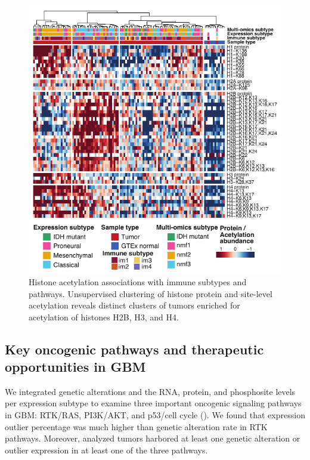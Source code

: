 \begin{figure}[tb]
    \centering
    \includegraphics[width=0.75\linewidth]{figures/chap04_cptac_gbm_discov/figure5_histone_acetyl.pdf}
    \caption[Histone acetylation associations with immune subtypes and pathways.]{%
        Histone acetylation associations with immune subtypes and pathways.
        Unsupervised clustering of histone protein and site-level acetylation reveals distinct clusters of tumors enriched for acetylation of histones H2B, H3, and H4.
    }
    \label{fig:gbm-histone-acetyl}
\end{figure}


\subsection{Key oncogenic pathways and therapeutic opportunities in GBM}
We integrated genetic alterations and the RNA, protein, and phosphosite levels per expression subtype to examine three important oncogenic signaling pathways in GBM: RTK/RAS, PI3K/AKT, and p53/cell cycle (). We found that expression outlier percentage was much higher than genetic alteration rate in RTK pathways. Moreover, analyzed tumors harbored at least one genetic alteration or outlier expression in at least one of the three pathways.

